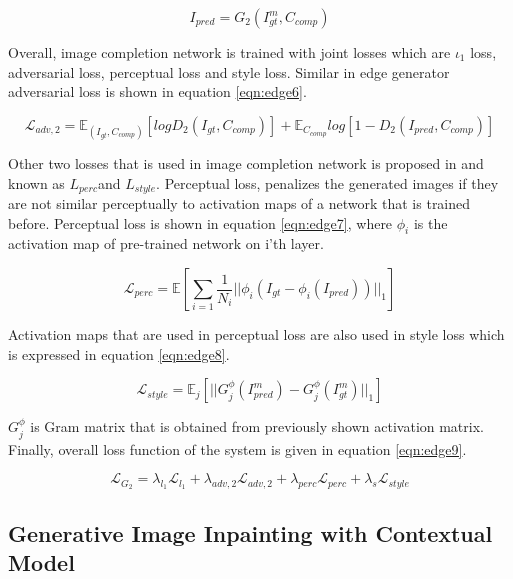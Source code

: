 \begin{equation}
\label{eqn:edge5}
    I_{pred} = G_2 (I^m_{gt}, C_{comp})
\end{equation}

Overall, image completion network is trained with joint losses which are \(\iota_1\) loss, adversarial loss, perceptual loss and style loss. Similar in edge generator adversarial loss is shown in equation \ref{eqn:edge6}. 

\begin{equation}
\label{eqn:edge6}
    \mathcal{L}_{adv,2} = \mathbb{E}_{(I_{gt},C_{comp})}[logD_{2}(I_{gt},C_{comp})]+\mathbb{E}_{C_{comp}}log[1-D_{2} (I_{pred}, C_{comp})]
\end{equation}

Other two losses that is used in image completion network is proposed in \cite{style} and \cite{perceptual} known as \(L_{perc}\)\space and \space \(L_{style}\).  Perceptual loss, penalizes the generated images if they are not similar perceptually to activation maps of a network that is trained before. Perceptual loss is shown in equation \ref{eqn:edge7}, where \(\phi_i\) is the activation map of pre-trained network on i’th layer.

\begin{equation}
\label{eqn:edge7}
    \mathcal{L}_{perc} = \mathbb{E}[ \sum\limits_{i=1}\frac{1}{N_i} || \phi_i(I_{gt}-\phi_i (I_{pred}) ) ||_1 ]
\end{equation}

Activation maps that are used in perceptual loss are also used in style loss which is expressed in equation \ref{eqn:edge8}.

\begin{equation}
\label{eqn:edge8}
    \mathcal{L}_{style} = \mathbb{E}_j [ || G_j^{\phi} (I^m_{pred})- G_j^{\phi} (I^m_{gt}) ||_1 ]
\end{equation}

\(G_j^\phi\) is Gram matrix that is obtained from previously shown activation matrix. Finally, overall loss function of the system is given in equation \ref{eqn:edge9}.

\begin{equation}
\label{eqn:edge9}
    \mathcal{L}_{G_2}=\lambda_{l_1}\mathcal{L}_{l_1} + \lambda_{adv,2}\mathcal{L}_{adv,2} + \lambda_{perc}\mathcal{L}_{perc} + \lambda_{s}\mathcal{L}_{style}
\end{equation}

\subsection{Generative Image Inpainting with Contextual Model}

